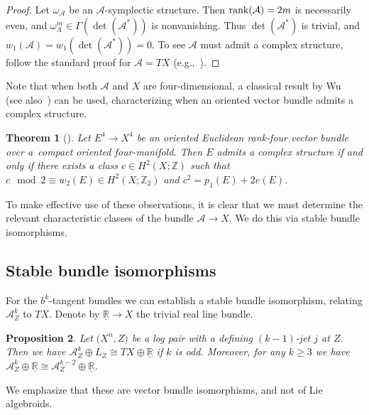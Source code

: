 \documentclass[pdftex]{sigma}
\numberwithin{equation}{section}
\newtheorem{Theorem}{Theorem}[section]
\newtheorem{Proposition}[Theorem]{Proposition}
 { \theoremstyle{definition}
\newtheorem{Definition}[Theorem]{Definition}
\newtheorem{Example}[Theorem]{Example}
\newtheorem{Remark}[Theorem]{Remark} }
\begin{document}
\begin{proof} Let $\omega_\mathcal{A}$ be an $\mathcal{A}$-symplectic structure. Then ${\rm rank}(\mathcal{A}) = 2m$ is necessarily even, and $\omega_{A}^m \in \Gamma(\det(\mathcal{A}^*))$ is nonvanishing. Thus $\det(\mathcal{A}^*)$ is trivial, and $w_1(\mathcal{A}) = w_1(\det(\mathcal{A}^*)) = 0$. To see $\mathcal{A}$ must admit a complex structure, follow the standard proof for $\mathcal{A} = TX$ (e.g.,~\cite{McDuffSalamon17}).
\end{proof}

Note that when both $\mathcal{A}$ and $X$ are four-dimensional, a classical result by Wu~\cite{Wu52} (see also~\cite{HirzebruchHopf58}) can be used, characterizing when an oriented vector bundle admits a complex structure.

\begin{Theorem}[\cite{Wu52}]\label{thm:wuacs} Let $E^4 \to X^4$ be an oriented Euclidean rank-four vector bundle over a~compact oriented four-manifold. Then $E$ admits a complex structure if and only if there exists a class $c \in H^2(X;\mathbb{Z})$ such that $c \!\!\mod 2 \equiv w_2(E) \in H^2(X;\mathbb{Z}_2)$ and $c^2 = p_1(E) + 2 e(E)$.
\end{Theorem}

To make effective use of these observations, it is clear that we must determine the relevant characteristic classes of the bundle $\mathcal{A} \to X$. We do this via stable bundle isomorphisms.

\subsection{Stable bundle isomorphisms}\label{sec:stablebundleiso}

For the $b^k$-tangent bundles we can establish a stable bundle isomorphism, relating $\mathcal{A}_Z^k$ to $TX$. Denote by ${\underline{\mathbb{R}}} \to X$ the trivial real line bundle.

\begin{Proposition}\label{prop:bkbundleiso} Let $\big(X^n,Z\big)$ be a log pair with a defining $(k-1)$-jet $j$ at $Z$. Then we have $\mathcal{A}_Z^k \oplus L_Z \cong TX \oplus \underline{\mathbb{R}}$ if $k$ is odd. Moreover, for any $k \geq 3$ we have $\mathcal{A}_Z^k \oplus \underline{\mathbb{R}} \cong \mathcal{A}_Z^{k-2} \oplus \underline{\mathbb{R}}$.
\end{Proposition}

We emphasize that these are vector bundle isomorphisms, and not of Lie algebroids.
\end{document}

